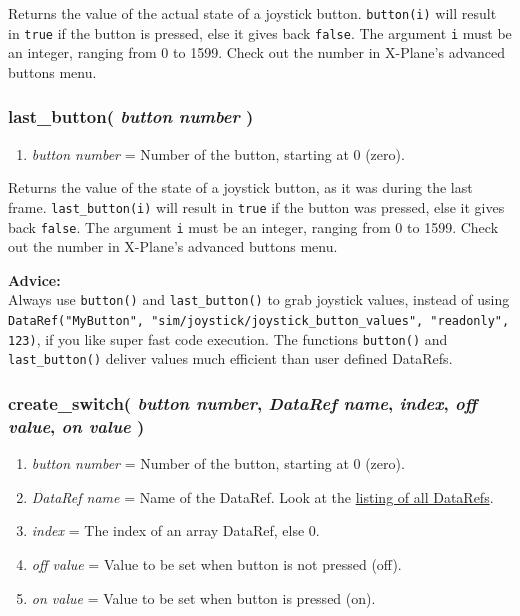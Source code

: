 \documentclass[11pt,parskip=half,a4paper]{scrartcl}
\begin{document}
Returns the value of the actual state of a joystick button. \verb|button(i)| will result in \verb|true| if the button is pressed, else it gives back \verb|false|. The argument \verb|i| must be an integer, ranging from 0 to 1599. Check out the number in X-Plane's advanced buttons menu.

\subsubsection{last\_button( \emph{button number} )}

\begin{enumerate}
	\item \emph{button number} = Number of the button, starting at 0 (zero).
\end{enumerate}

Returns the value of the state of a joystick button, as it was during the last frame. \verb|last_button(i)| will result in \verb|true| if the button was pressed, else it gives back \verb|false|. The argument \verb|i| must be an integer, ranging from 0 to 1599. Check out the number in X-Plane's advanced buttons menu.

\textbf{Advice:}\\
Always use \verb|button()| and \verb|last_button()| to grab joystick values, instead of using\\ \verb|DataRef("MyButton", "sim/joystick/joystick_button_values", "readonly", 123)|, if you like super fast code execution. The functions \verb|button()| and \verb|last_button()| deliver values much efficient than user defined DataRefs.

\subsubsection{create\_switch( \emph{button number}, \emph{DataRef name}, \emph{index}, \emph{off value}, \emph{on value} )}

\begin{enumerate}
	\item \emph{button number} = Number of the button, starting at 0 (zero).
	\item \emph{DataRef name} = Name of the DataRef. Look at the \href{http://www.xsquawkbox.net/xpsdk/docs/DataRefs.html}{listing of all DataRefs}.
	\item \emph{index} = The index of an array DataRef, else 0.
	\item \emph{off value} = Value to be set when button is not pressed (off).
	\item \emph{on value} = Value to be set when button is pressed (on).
\end{enumerate}
\end{document}
